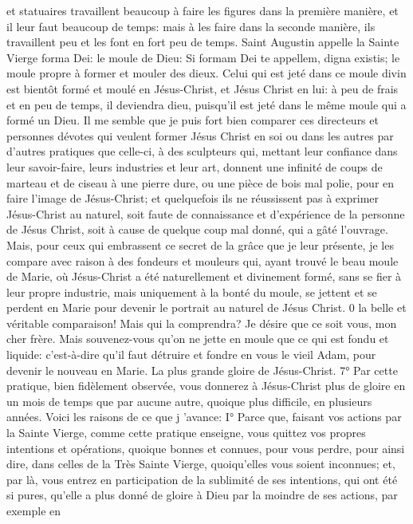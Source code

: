 et statuaires travaillent beaucoup à faire les figures dans la première manière, et il leur faut beaucoup de temps:
mais à les faire dans la seconde manière, ils travaillent peu et les font en fort peu de temps. Saint Augustin appelle
la Sainte Vierge forma Dei: le moule de Dieu: Si formam Dei te appellem, digna existis; le moule propre à former et
mouler des dieux. Celui qui est jeté dans ce moule divin est bientôt formé et moulé en Jésus-Christ, et Jésus Christ en lui: à peu de frais et en peu de temps, il deviendra dieu, puisqu'il est jeté dans le même moule qui a
formé un Dieu.
 Il me semble que je puis fort bien comparer ces directeurs et personnes dévotes qui veulent former Jésus Christ en soi ou dans les autres par d'autres pratiques que celle-ci, à des sculpteurs qui, mettant leur confiance
dans leur savoir-faire, leurs industries et leur art, donnent une infinité de coups de marteau et de ciseau à une
pierre dure, ou une pièce de bois mal polie, pour en faire l'image de Jésus-Christ; et quelquefois ils ne réussissent
pas à exprimer Jésus-Christ au naturel, soit faute de connaissance et d'expérience de la personne de Jésus Christ, soit à cause de quelque coup mal donné, qui a gâté l'ouvrage. Mais, pour ceux qui embrassent ce secret de
la grâce que je leur présente, je les compare avec raison à des fondeurs et mouleurs qui, ayant trouvé le beau
moule de Marie, où Jésus-Christ a été naturellement et divinement formé, sans se fier à leur propre industrie, mais
uniquement à la bonté du moule, se jettent et se perdent en Marie pour devenir le portrait au naturel de Jésus Christ.
 0 la belle et véritable comparaison! Mais qui la comprendra? Je désire que ce soit vous, mon cher frère. Mais
souvenez-vous qu'on ne jette en moule que ce qui est fondu et liquide: c'est-à-dire qu'il faut détruire et fondre en
vous le vieil Adam, pour devenir le nouveau en Marie.
La plus grande gloire de Jésus-Christ.
 7° Par cette pratique, bien fidèlement observée, vous donnerez à Jésus-Christ plus de gloire en un mois de
temps que par aucune autre, quoique plus difficile, en plusieurs années. Voici les raisons de ce que j 'avance:
I° Parce que, faisant vos actions par la Sainte Vierge, comme cette pratique enseigne, vous quittez vos propres
intentions et opérations, quoique bonnes et connues, pour vous perdre, pour ainsi dire, dans celles de la Très
Sainte Vierge, quoiqu'elles vous soient inconnues; et, par là, vous entrez en participation de la sublimité de ses
intentions, qui ont été si pures, qu'elle a plus donné de gloire à Dieu par la moindre de ses actions, par exemple en
